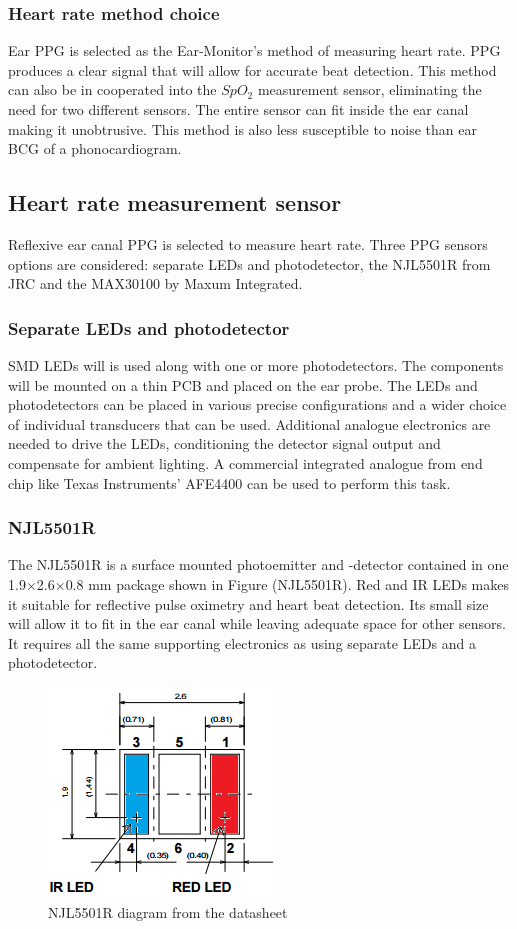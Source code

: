 \subsubsection{Heart rate method choice}
Ear PPG is selected as the Ear-Monitor's method of measuring heart rate. PPG produces a clear signal that will allow for accurate beat detection. This method can also be in cooperated into the $SpO_2$ measurement sensor, eliminating the need for two different sensors. The entire sensor can fit inside the ear canal making it unobtrusive. This method is also less susceptible to noise than ear BCG of a phonocardiogram.

\subsection{Heart rate measurement sensor}
Reflexive ear canal PPG is selected to measure heart rate. Three PPG sensors options are considered: separate LEDs and photodetector, the NJL5501R from JRC and the MAX30100 by Maxum Integrated.

\subsubsection{Separate LEDs and photodetector}
SMD LEDs will is used along with one or more photodetectors. The components will be mounted on a thin PCB and placed on the ear probe. The LEDs and photodetectors can be placed in various precise configurations and a wider choice of individual transducers that can be used. Additional analogue electronics are needed to drive the LEDs, conditioning the detector signal output and compensate for ambient lighting. A commercial integrated analogue from end chip like Texas Instruments' AFE4400 can be used to perform this task.

\subsubsection{NJL5501R}
The NJL5501R is a surface mounted photoemitter and -detector contained in one 1.9$\times$2.6$\times$0.8 mm package shown in Figure (NJL5501R). Red and IR LEDs makes it suitable for reflective pulse oximetry and heart beat detection. Its small size will allow it to fit in the ear canal while leaving adequate space for other sensors. It requires all the same supporting electronics as using separate LEDs and a photodetector.

 \begin{figure}[h]
   \centering
   \includegraphics[scale=1]{figs/NJL5501R.png}
   \caption{NJL5501R diagram from the datasheet}
   \label{fig:NJL5501R}
\end{figure}

